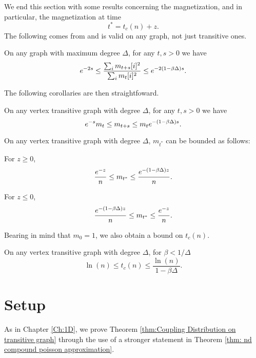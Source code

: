 We end this section with some results concerning the magnetization, and in particular, the magnetization at time
\begin{equation}
	t^* = t_c(n) + z.
\end{equation}
The following comes from \cite{Lubetzky2017-nc} and is valid on any graph, not just transitive ones.
\begin{lemma}
	On any graph with maximum degree $\Delta$, for any $t, s > 0$ we have
	\begin{equation}
		e^{-2s} \leq \frac{\sum_i m_{t+s}[i]^2}{\sum_i m_t[i]^2} \leq e^{-2(1 - \beta \Delta)s}.
	\end{equation}
\end{lemma}
The following corollaries are then straightfoward.
\begin{corollary}
	\label{cor:exponential decay magnetization}
	On any vertex transitive graph with degree $\Delta$, for any $t, s > 0$ we have
	\begin{equation}
		e^{-s} m_t \leq m_{t+s} \leq m_t e^{-(1 - \beta \Delta)s}.
	\end{equation}
\end{corollary}
\begin{corollary}
\label{cor:magnetization of t star}
	On any vertex transitive graph with degree $\Delta$, $m_{t^*}$ can be bounded as follows:

	For $z \geq 0$,
	\begin{equation}
		\frac{e^{-z}}{n} \leq m_{t^*} \leq \frac{e^{-(1 - \beta \Delta)z}}{n}.
	\end{equation}

	For $z \leq 0$,
	\begin{equation}
		\frac{e^{-(1 - \beta \Delta)z}}{n} \leq m_{t^*} \leq \frac{e^{-z}}{n}.
	\end{equation}
\end{corollary}
Bearing in mind that $m_0 = 1$, we also obtain a bound on $t_c(n)$.
\begin{corollary}
	On any vertex transitive graph with degree $\Delta$, for $\beta < 1/\Delta$
	\begin{equation}
		\ln(n) \leq t_c(n) \leq \frac{\ln(n)}{1 - \beta \Delta}.
	\end{equation}
\end{corollary}

\section{Setup}
\label{sec:nd problem setup}
As in Chapter \ref{Ch:1D}, we prove Theorem \ref{thm:Coupling Distribution on transitive graph} through the use of a stronger statement in Theorem \ref{thm: nd compound poisson approximation}.

